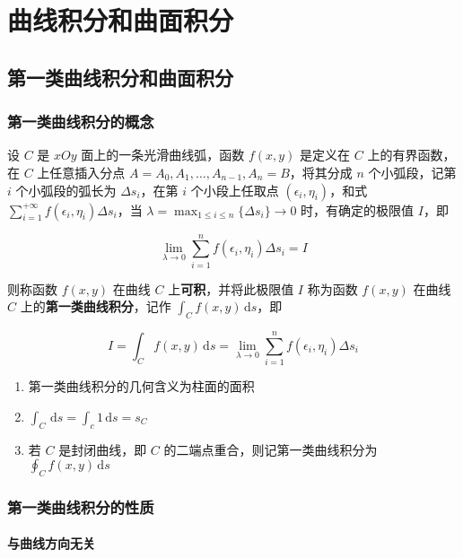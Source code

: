 \documentclass[lang = zh , final , oneside , openany , titlepage , zihao = -4 , linespread = 1.3 , baselineskip = false , cjk-font = windows , text-font = newtx , math-font = newtx , math-style = TeX]{sjtureport}
\begin{document}
\chapter{曲线积分和曲面积分}

\section{第一类曲线积分和曲面积分}

\subsection{第一类曲线积分的概念}

\begin{definition}
    设 \(C\) 是 \(xOy\) 面上的一条光滑曲线弧，函数 \(f(x,y)\) 是定义在 \(C\)
上的有界函数，在 \(C\) 上任意插入分点
\(A = A_0,A_1,\ldots,A_{n-1},A_n=B\)，将其分成 \(n\) 个小弧段，记第
\(i\) 个小弧段的弧长为 \(\Delta s_i\)，在第 \(i\) 个小段上任取点
\((\epsilon_i,\eta_i)\)，和式
\(\displaystyle\sum_{i=1}^{+\infty}f(\epsilon_i,\eta_i)\Delta s_i\)，当
\(\displaystyle\lambda=\max_{1\leq i\leq n}\{\Delta s_i\}\to 0\)
时，有确定的极限值 \(I\)，即

\[\lim_{\lambda\to 0}\sum_{i=1}^nf(\epsilon_i,\eta_i)\Delta s_i = I\]

则称函数 \(f(x,y)\) 在曲线 \(C\) 上\textbf{可积}，并将此极限值 \(I\)
称为函数 \(f(x,y)\) 在曲线 \(C\) 上的\textbf{第一类曲线积分}，记作
\(\displaystyle\int_Cf(x,y)\,\mathrm{d}s\)，即

\[I = \int_C f(x,y)\,\mathrm{d}s = \lim_{\lambda\to 0}\sum_{i=1}^nf(\epsilon_i,\eta_i)\Delta s_i\]
\end{definition}

\begin{enumerate}
\item
  第一类曲线积分的几何含义为柱面的面积
\item
  \(\displaystyle\int_C\,\mathrm{d}s = \displaystyle\int_c1\,\mathrm{d}s=s_C\)
\item
  若 \(C\) 是封闭曲线，即 \(C\) 的二端点重合，则记第一类曲线积分为
  \(\displaystyle\oint_Cf(x,y)\,\mathrm{d}s\)
\end{enumerate}

\subsection{第一类曲线积分的性质}

\subsubsection{与曲线方向无关}
\end{document}
